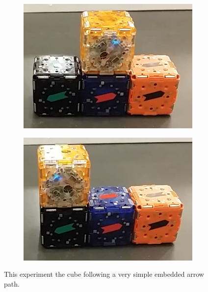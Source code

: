 \begin{figure}[h]
	\begin{subfigure}[b]{0.48\linewidth}
		\includegraphics[width=0.95\linewidth]{figures/arrows3.png}
		\subcaption{} 
	\end{subfigure}
	\begin{subfigure}[b]{0.48\linewidth}
		\includegraphics[width=0.95\linewidth]{figures/arrows4.png}
		\subcaption{} 
	\end{subfigure}
	
	\caption{This experiment the cube following a very simple embedded arrow path.}
	
	\label{fig:arrowExperiment}
\end{figure}

